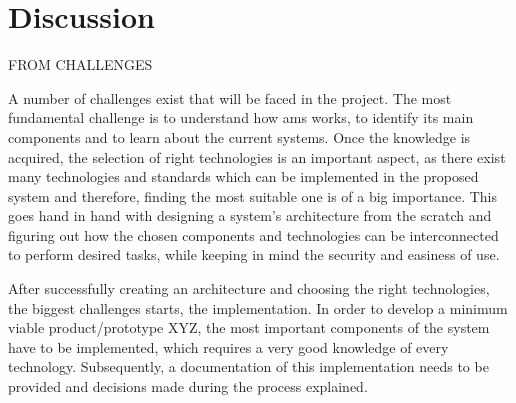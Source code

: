 \section{Discussion}\label{sec:discussion}

FROM CHALLENGES

A number of challenges exist that will be faced in the project. The most fundamental challenge is to understand how \acrshort{ams} works, to identify its main components and to learn about the current systems. Once the knowledge is acquired, the selection of right technologies is an important aspect, as there exist many technologies and standards which can be implemented in the proposed system and therefore, finding the most suitable one is of a big importance. This goes hand in hand with designing a system’s architecture from the scratch and figuring out how the chosen components and technologies can be interconnected to perform desired tasks, while keeping in mind the security and easiness of use.

After successfully creating an architecture and choosing the right technologies, the biggest challenges starts, the implementation. In order to develop a minimum viable product/prototype XYZ, the most important components of the system have to be implemented, which requires a very good knowledge of every technology. Subsequently, a documentation of this implementation needs to be provided and decisions made during the process explained.
